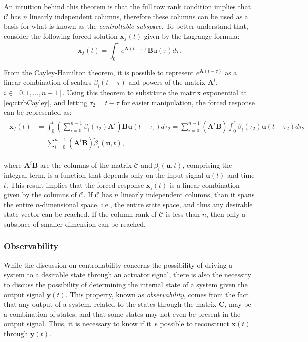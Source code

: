 \documentclass[a4paper,11pt]{book}
\numberwithin{figure}{chapter}
\numberwithin{equation}{chapter}
\numberwithin{table}{chapter}
\theoremstyle{definition}
\begin{document}
An intuition behind this theorem is that the full row rank condition implies that $\mathcal{C}$ has $n$ linearly independent columns, therefore these columns can be used as a basis for what is known as the \textit{controllable subspace}. To better understand that, consider the following forced solution $\bm{x}_f(t)$ given by the Lagrange formula:
\begin{equation} \label{eq:ctrbCayley}
    \bm{x}_f(t) = \int_{0}^{t} e^{\bm{A} (t-\tau)} \bm{B} \bm{u}(\tau) d\tau
.\end{equation}

From the Cayley-Hamilton theorem, it is possible to represent $e^{\bm{A}(t-\tau)}$ as a linear combination of scalars $\beta_i(t-\tau)$ and powers of the matrix $\bm{A}^i$, $i \in [0, 1,..., n-1]$. Using this theorem to substitute the matrix exponential at \eqref{eq:ctrbCayley}, and letting $\tau_2 = t - \tau$ for easier manipulation, the forced response can be represented as:
\begin{align}
\begin{split}
    \bm{x}_f(t) &= \int_{0}^{t} \left( \sum_{i=0}^{n-1} \beta_i(\tau_2) \bm{A}^i \right) \bm{B} \bm{u}(t - \tau_2) d\tau_2 = \sum_{i=0}^{n-1} \left( \bm{A}^i \bm{B} \right) \int_{0}^{t} \beta_i(\tau_2) \bm{u}(t - \tau_2) d\tau_2  \\
        &= \sum_{i=0}^{n-1} \left( \bm{A}^i \bm{B} \right) \tilde{\beta}_i(\bm{u}, t) ,
\end{split}
\end{align}

\noindent where $\bm{A}^i \bm{B}$ are the columns of the matrix $\bm{\mathcal{C}}$ and $\tilde{\beta}_i(\bm{u}, t)$, comprising the integral term, is a function that depends only on the input signal $\bm{u}(t)$ and time $t$. This result implies that the forced response $\bm{x}_f(t)$ is a linear combination given by the columns of $\bm{\mathcal{C}}$. If $\bm{\mathcal{C}}$ has $n$ linearly independent columns, than it spans the entire $n$-dimensional space, i.e., the entire state space, and thus any desirable state vector can be reached. If the column rank of $\bm{\mathcal{C}}$ is less than $n$, then only a subspace of smaller dimension can be reached.

\subsubsection{Observability}

While the discussion on controllability concerns the possibility of driving a system to a desirable state through an actuator signal, there is also the necessity to discuss the possibility of determining the internal state of a system given the output signal $\bm{y}(t)$. This property, known as \textit{observability}, comes from the fact that any output of a system, related to the states through the matrix $\bm{C}$, may be a combination of states, and that some states may not even be present in the output signal. Thus, it is necessary to know if it is possible to reconstruct $\bm{x}(t)$ through $\bm{y}(t)$. 
\end{document}
